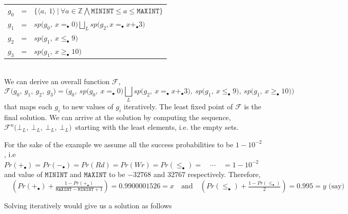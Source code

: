 \documentclass[final,3p, review, times]{Elsevier/elsarticle}
\begin{document}
\begin{tabular}{lcl}
$g_0$ & = & $\Big\{\big\langle a,\ 1\big\rangle\ \big|\ \forall a\in\mathbb{Z}\bigwedge\mathtt{MININT}\leq a\leq\mathtt{MAXINT}\Big\}$ \\
$g_1$ & = & $\displaystyle sp\big(g_0,\ x =_\bullet 0\big)\bigsqcup_L sp\big(g_2, x =_\bullet x +_\bullet 3\big)$ \\
$g_2$ & = & $sp\big(g_1,\ x \leq_\bullet9\big)$ \\
$g_3$ & = & $sp\big(g_1,\ x \geq_\bullet10\big)$ \\
\end{tabular}\\

We can derive an overall function $\mathcal{F}$,
$$\mathcal{F}\big(g_0,\ g_1,\ g_2,\ g_3\big) = \Big(g_0,\ sp\big(g_0,\ x =_\bullet 0\big)\bigsqcup_L sp\big(g_2,\ x =_\bullet x +_\bullet 3\big),\ sp\big(g_1,\ x \leq_\bullet 9\big),\ sp\big(g_1,\ x \geq_\bullet 10\big)\Big)$$
that maps each $g_i$ to new values of $g_i$ iteratively. The least fixed point of $\mathcal{F}$ is the final solution. We can arrive at the solution by computing the sequence, $\mathcal{F}^n\big(\bot_L,\ \bot_L,\ \bot_L,\ \bot_L\big)$\ starting with the least elements, i.e. the empty sets.

For the sake of the example we assume all the success probabilities to be $1-10^{-2}$, i.e $Pr(+_\bullet)=Pr(-_\bullet)=Pr(Rd)=Pr(Wr)=Pr(\leq_\bullet)=\quad\cdots\quad=1-10^{-2}$ and value of $\mathtt{MININT}$ and $\mathtt{MAXINT}$ to be $-32768$ and $32767$ respectively. Therefore, $\displaystyle\quad\left(Pr(+_\bullet)+\frac{1-Pr(+_\bullet)}{\mathtt{MAXINT}-\mathtt{MININT}+1}\right)=0.9900001526=x\quad\text{and}\quad\left(Pr(\leq_\bullet)+\frac{1-Pr(\leq_\bullet)}{2}\right)=0.995=y\text{ (say)}$

Solving iteratively would give us a solution as follows
\end{document}
